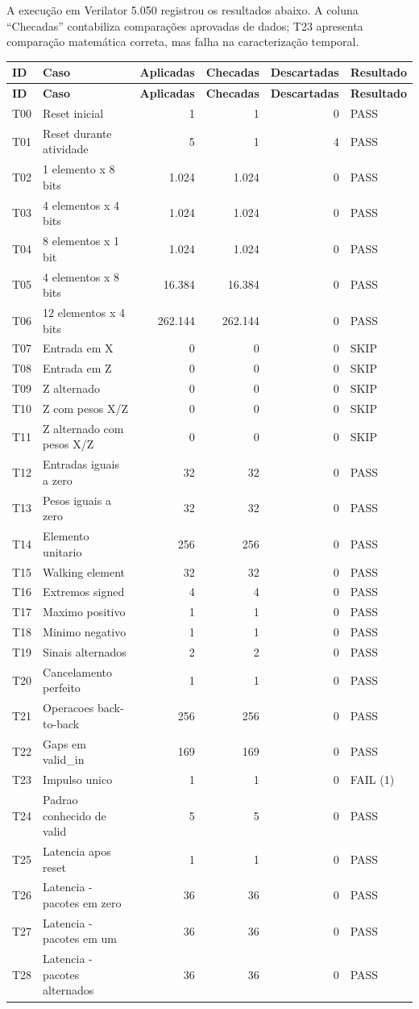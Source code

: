 \documentclass[12pt,a4paper]{article}
\begin{document}
A execução em Verilator 5.050 registrou os resultados abaixo. A coluna ``Checadas'' contabiliza comparações aprovadas de dados; T23 apresenta comparação matemática correta, mas falha na caracterização temporal.
\small
\begin{longtable}{p{1cm}p{9cm}rrrp{2cm}}
\toprule \textbf{ID} & \textbf{Caso} & \textbf{Aplicadas} & \textbf{Checadas} & \textbf{Descartadas} & \textbf{Resultado}\\\midrule
\endfirsthead
\toprule \textbf{ID} & \textbf{Caso} & \textbf{Aplicadas} & \textbf{Checadas} & \textbf{Descartadas} & \textbf{Resultado}\\\midrule
\endhead
T00 & Reset inicial & 1 & 1 & 0 & PASS \\
T01 & Reset durante atividade & 5 & 1 & 4 & PASS \\
T02 & 1 elemento x 8 bits & 1.024 & 1.024 & 0 & PASS \\
T03 & 4 elementos x 4 bits & 1.024 & 1.024 & 0 & PASS \\
T04 & 8 elementos x 1 bit & 1.024 & 1.024 & 0 & PASS \\
T05 & 4 elementos x 8 bits & 16.384 & 16.384 & 0 & PASS \\
T06 & 12 elementos x 4 bits & 262.144 & 262.144 & 0 & PASS \\
T07 & Entrada em X & 0 & 0 & 0 & SKIP \\
T08 & Entrada em Z & 0 & 0 & 0 & SKIP \\
T09 & Z alternado & 0 & 0 & 0 & SKIP \\
T10 & Z com pesos X/Z & 0 & 0 & 0 & SKIP \\
T11 & Z alternado com pesos X/Z & 0 & 0 & 0 & SKIP \\
T12 & Entradas iguais a zero & 32 & 32 & 0 & PASS \\
T13 & Pesos iguais a zero & 32 & 32 & 0 & PASS \\
T14 & Elemento unitario & 256 & 256 & 0 & PASS \\
T15 & Walking element & 32 & 32 & 0 & PASS \\
T16 & Extremos signed & 4 & 4 & 0 & PASS \\
T17 & Maximo positivo & 1 & 1 & 0 & PASS \\
T18 & Minimo negativo & 1 & 1 & 0 & PASS \\
T19 & Sinais alternados & 2 & 2 & 0 & PASS \\
T20 & Cancelamento perfeito & 1 & 1 & 0 & PASS \\
T21 & Operacoes back-to-back & 256 & 256 & 0 & PASS \\
T22 & Gaps em valid\_in & 169 & 169 & 0 & PASS \\
T23 & Impulso unico & 1 & 1 & 0 & FAIL (1) \\
T24 & Padrao conhecido de valid & 5 & 5 & 0 & PASS \\
T25 & Latencia apos reset & 1 & 1 & 0 & PASS \\
T26 & Latencia - pacotes em zero & 36 & 36 & 0 & PASS \\
T27 & Latencia - pacotes em um & 36 & 36 & 0 & PASS \\
T28 & Latencia - pacotes alternados & 36 & 36 & 0 & PASS \\
\bottomrule
\end{longtable}
\end{document}
